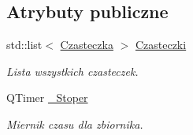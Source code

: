 \subsection*{Atrybuty publiczne}
\begin{DoxyCompactItemize}
\item 
std\-::list$<$ \hyperlink{class_czasteczka}{Czasteczka} $>$ \hyperlink{class_zbiornik_a751209f2f02a7eaf3b7a3283d8fcd3ad}{Czasteczki}
\begin{DoxyCompactList}\small\item\em Lista wszystkich czasteczek. \end{DoxyCompactList}\item 
Q\-Timer \hyperlink{class_zbiornik_a5ca8ac1357ef59110d4a9e12aae2bd99}{\-\_\-\-Stoper}
\begin{DoxyCompactList}\small\item\em Miernik czasu dla zbiornika. \end{DoxyCompactList}\end{DoxyCompactItemize}
